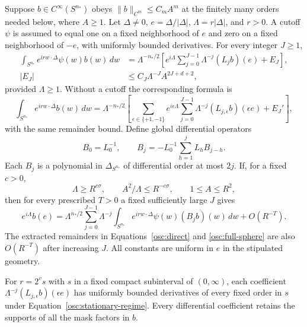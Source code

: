 \begin{lemma}
\label{osc:stationary}
Suppose $b\in C^\infty(S^{n_*})$ obeys
$\|b\|_{C^m}\le C_m A^m$ at the finitely many orders needed below, where
$A\ge1$.  Let $\Delta\ne0$, $e=\Delta/|\Delta|$,
$\Lambda=r|\Delta|$, and $r>0$.  A cutoff $\psi$ is assumed to equal one
on a fixed neighborhood of $e$ and zero on a fixed neighborhood of
$-e$, with uniformly bounded derivatives.  For every integer $J\ge1$,
\begin{equation}\label{osc:direct}
 \begin{aligned}
 \int_{S^{n_*}}e^{irw\cdot\Delta}\psi(w)b(w)\,dw
 &=\Lambda^{-n_*/2}
   \left[e^{i\Lambda}\sum_{j=0}^{J-1}
                    \Lambda^{-j}(L_jb)(e)+E_J\right],\\
 |E_J|&\le C_J\Lambda^{-J}A^{2J+d+2},
 \end{aligned}
\end{equation}
provided $\Lambda\ge1$.  Without a cutoff the corresponding formula is
\begin{equation}\label{osc:full-sphere}
 \int_{S^{n_*}}e^{irw\cdot\Delta}b(w)\,dw
 =\Lambda^{-n_*/2}
   \left[\sum_{\epsilon\in\{+1,-1\}}e^{i\epsilon\Lambda}
       \sum_{j=0}^{J-1}\Lambda^{-j}
                 (L_{j,\epsilon}b)(\epsilon e)+E_J'\right],
\end{equation}
with the same remainder bound.  Define global differential operators
\begin{equation}\label{osc:B-operators}
 B_0=L_0^{-1},\qquad
 B_j=-L_0^{-1}\sum_{h=1}^j L_h B_{j-h}.
\end{equation}
Each $B_j$ is a polynomial in $\Delta_{S^{n_*}}$ of differential order at
most $2j$.  If, for a fixed $c>0$,
\begin{equation}\label{osc:stationary-regime}
 \Lambda\ge R^{c\sigma},\qquad
 A^2/\Lambda\le R^{-c\sigma},\qquad 1\le A\le R^2,
\end{equation}
then for every prescribed $T>0$ a fixed sufficiently large $J$ gives
\begin{equation}\label{osc:inverse}
 e^{i\Lambda}b(e)
 =\Lambda^{n_*/2}\sum_{j=0}^{J-1}\Lambda^{-j}
       \int_{S^{n_*}}e^{irw\cdot\Delta}\psi(w)(B_jb)(w)\,dw
       +O(R^{-T}).
\end{equation}
The extracted remainders in Equations~\eqref{osc:direct} and
\eqref{osc:full-sphere} are also $O(R^{-T})$ after increasing $J$.
All constants are uniform in $e$ in the stipulated geometry.

For $r=2^v s$ with $s$ in a fixed compact subinterval of $(0,\infty)$,
each coefficient $\Lambda^{-j}(L_{j,\epsilon}b)(\epsilon e)$ has uniformly
bounded derivatives of every fixed order in $s$ under
Equation~\eqref{osc:stationary-regime}.  Every differential coefficient
retains the supports of all the mask factors in $b$.
\end{lemma}

